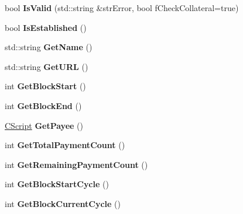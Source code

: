 \begin{DoxyCompactItemize}
\item 
\mbox{\label{class_c_budget_proposal_afaa5e910085e8f0aea26aad6fa99ed2b}} 
bool {\bfseries Is\+Valid} (std\+::string \&str\+Error, bool f\+Check\+Collateral=true)
\item 
\mbox{\label{class_c_budget_proposal_a0f4231aa216c99a6a3ad2b6bf31d8bfe}} 
bool {\bfseries Is\+Established} ()
\item 
\mbox{\label{class_c_budget_proposal_a7f3bf6d86e4f4af03a45aa1c6d177af1}} 
std\+::string {\bfseries Get\+Name} ()
\item 
\mbox{\label{class_c_budget_proposal_a4bddce62840e993e7351e68bfafca05d}} 
std\+::string {\bfseries Get\+U\+RL} ()
\item 
\mbox{\label{class_c_budget_proposal_a711280cfc20e1d1a76a2b8c59dfe26ad}} 
int {\bfseries Get\+Block\+Start} ()
\item 
\mbox{\label{class_c_budget_proposal_ad3e5e60c9fe53d7aef3314634eae54d7}} 
int {\bfseries Get\+Block\+End} ()
\item 
\mbox{\label{class_c_budget_proposal_a5489ea6b1dd54e25c2a0a52ef67e71a1}} 
\mbox{\hyperlink{class_c_script}{C\+Script}} {\bfseries Get\+Payee} ()
\item 
\mbox{\label{class_c_budget_proposal_a54cc431d667a7dfa1e010d6ff17a40c4}} 
int {\bfseries Get\+Total\+Payment\+Count} ()
\item 
\mbox{\label{class_c_budget_proposal_a1fef390cf24f7f110c375ab6e7d01f50}} 
int {\bfseries Get\+Remaining\+Payment\+Count} ()
\item 
\mbox{\label{class_c_budget_proposal_a66de6699a9cc9b084eecf014a168bab8}} 
int {\bfseries Get\+Block\+Start\+Cycle} ()
\item 
\mbox{\label{class_c_budget_proposal_a33ad377cb08046ac197041fb6a06df6e}} 
int {\bfseries Get\+Block\+Current\+Cycle} ()

\end{DoxyCompactItemize}
